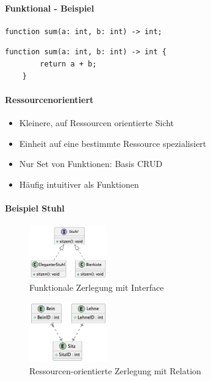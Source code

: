 \begin{frame}[fragile]
  \framesubtitle{Funktional - Beispiel}
  \begin{lstlisting}[caption={Funktionssignatur},captionpos=b,label={lst:signatur}]
    function sum(a: int, b: int) -> int;
  \end{lstlisting}

  \begin{lstlisting}[caption={Funktionssemantik},captionpos=b,label={lst:semantik}]
    function sum(a: int, b: int) -> int {
        return a + b;
    }
  \end{lstlisting}
\end{frame}

\begin{frame}
  \framesubtitle{Ressourcenorientiert}
  \begin{itemize}
    \item Kleinere, auf Ressourcen orientierte Sicht 
    \item Einheit auf eine bestimmte Ressource spezialisiert
    \item Nur Set von Funktionen: Basis CRUD
    \item Häufig intuitiver als Funktionen
  \end{itemize} 
\end{frame}


\begin{frame}
  \framesubtitle{Beispiel Stuhl}
  \begin{figure}[ht]
  \centering
  \includegraphics[width=0.3\textwidth]{fig/uml/stuhl-function.png}
  \caption{Funktionale Zerlegung mit Interface}
  \label{fig:stuhl-f}
  \end{figure}
  \begin{figure}[ht]
  \centering
  \includegraphics[width=0.3\textwidth]{fig/uml/stuhl-resourcen.png}
  \caption{Ressourcen-orientierte Zerlegung mit Relation}
  \label{fig:stuhl-r}
  \end{figure}
\end{frame}

